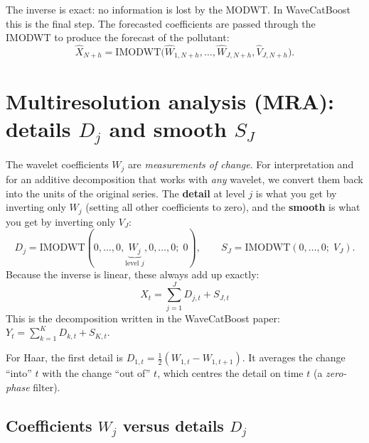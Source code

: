 \documentclass[11pt,a4paper]{article}
\begin{document}
The inverse is exact: no information is lost by the MODWT. In WaveCatBoost this is the final
step. The forecasted coefficients are passed through the IMODWT to produce the forecast of the pollutant:
\[
  \hat X_{N+h} = \text{IMODWT}\big(\hat W_{1,N+h},\dots,\hat W_{J,N+h},\hat V_{J,N+h}\big).
\]

\section{Multiresolution analysis (MRA): details $D_j$ and smooth $S_J$}
\label{sec:mra}

The wavelet coefficients $W_j$ are \emph{measurements of change}. For interpretation and for an additive
decomposition that works with \emph{any} wavelet, we convert them back into the units of the original series.
The \textbf{detail} at level $j$ is what you get by inverting only $W_j$ (setting all other
coefficients to zero), and the \textbf{smooth} is what you get by inverting only $V_J$:
\[
  D_j = \text{IMODWT}(0,\dots,0,\underbrace{W_j}_{\text{level }j},0,\dots,0;\;0),
  \qquad
  S_J = \text{IMODWT}(0,\dots,0;\;V_J).
\]
Because the inverse is linear, these always add up exactly:
\begin{equation}
  \boxed{\;X_t = \sum_{j=1}^{J} D_{j,t} + S_{J,t}\;}
  \label{eq:mra}
\end{equation}
This is the decomposition written in the WaveCatBoost paper: $Y_t=\sum_{k=1}^K D_{k,t}+S_{K,t}$.

For Haar, the first detail is $D_{1,t}=\tfrac12(W_{1,t}-W_{1,t+1})$. It averages the change ``into'' $t$ with the
change ``out of'' $t$, which centres the detail on time $t$ (a \emph{zero-phase} filter).

\begin{table}[H]
\centering

\caption{Haar MRA of the example series. Example: $D_{1,0}=\tfrac12(W_{1,0}-W_{1,1})=\tfrac12(-3-1)=-2$.}
\label{tab:mra}
\end{table}

\subsection{Coefficients $W_j$ versus details $D_j$}
\end{document}
